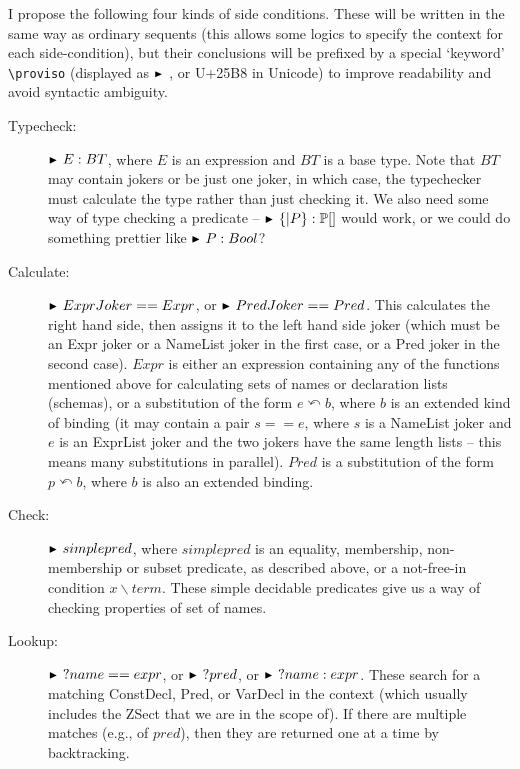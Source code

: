 \documentclass{article}
\newcommand{\notfreein}{\mathbin{\backslash}}
\newcommand{\substitute}{\mathrel{\curvearrowleft}}  %
\newcommand{\proviso}{\raisebox{0.5ex}{${}_{\blacktriangleright}\ $}}%
\begin{document}
I propose the following four kinds of side conditions.
These will be written in the same way as ordinary sequents
(this allows some logics to specify the context for each
side-condition), but their conclusions will be prefixed by
a special `keyword' \verb!\proviso! (displayed as $\proviso$,
or U+25B8 in Unicode) to improve readability and avoid syntactic ambiguity.
\begin{description}
\item[Typecheck:] $\proviso E:BT$, where $E$ is an expression and $BT$
  is a base type.  Note that $BT$ may contain jokers or be just one 
  joker, in which case, the typechecker must calculate the type rather
  than just checking it.  We also need some way of type checking
  a predicate -- $\proviso \{|P\}:\power []$ would work, or we
  could do something prettier like $\proviso P:Bool$?
\item[Calculate:] $\proviso ExprJoker == Expr$, or $\proviso PredJoker==Pred$.
  This calculates the right hand side, then assigns it to the left hand
  side joker (which must be an Expr joker or a NameList joker
  in the first case, or a Pred joker in the second case).
  $Expr$ is either an expression containing any of the functions mentioned
  above for calculating sets of names or declaration lists (schemas),
  or a substitution of the form $e \substitute b$, where $b$ is an
  extended kind of binding (it may contain a pair $s==e$, where $s$
  is a NameList joker and $e$ is an ExprList joker and the two
  jokers have the same length lists -- this means many substitutions
  in parallel).
  $Pred$ is a substitution of the form $p \substitute b$, where
  $b$ is also an extended binding.
\item[Check:] $\proviso simplepred$, where $simplepred$ is an
  equality, membership, non-membership or subset predicate, as
  described above, or a not-free-in condition $x \notfreein term$.
  These simple decidable predicates give us a
  way of checking properties of set of names.
\item[Lookup:] $\proviso? name==expr$, or $\proviso? pred$, or
  $\proviso? name:expr$.  These search for a matching ConstDecl,
  Pred, or VarDecl in the context (which usually includes the ZSect
  that we are in the scope of).  If there are multiple matches
  (e.g., of $pred$), then they are returned one at a time by backtracking.


\end{description}
\end{document}
